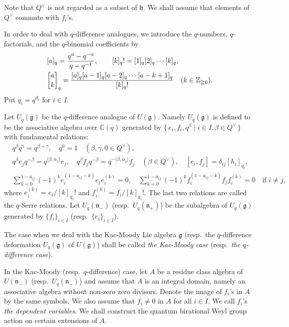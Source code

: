 \documentclass[12pt,twoside]{article}
\newcommand\bra{\langle}
\newcommand\ket{\rangle}
\newcommand\Qv{Q^\vee}
\newcommand\g{{\mathfrak g}}
\newcommand\h{{\mathfrak h}}
\newcommand\n{{\mathfrak n}}
\newcommand\Z{{\mathbb Z}} %
\newcommand\C{{\mathbb C}} %
\theoremstyle{plain} %
\theoremstyle{definition} %
\theoremstyle{definition} %
\numberwithin{theorem}{section}
\numberwithin{equation}{section}
\numberwithin{figure}{section}
\numberwithin{table}{section}
\begin{document}
Note that $\Qv$ is not regarded as a subset of $\h$.
We shall assume that elements of $\Qv$ commute with $f_i$'s.

In order to deal with $q$-difference analogues, 
we introduce the $q$-numbers, $q$-factorials, and 
the $q$-binomial coefficients by
\begin{align*}
 &
 [a]_q = \frac{q^a-q^{-a}}{q-q^{-1}}, \qquad
 [k]_q! = [1]_q[2]_q\cdots[k]_q, \quad
 \\ &
 \qbinom{a}{k}_q =
 \frac{[a]_q[a-1]_q[a-2]_q\cdots[a-k+1]_q}{[k]_q!}
 \quad  (k\in\Z_{\geqq0}).
\end{align*}
Put $q_i = q^{d_i}$ for $i\in I$.

Let $U_q(\g)$ be the $q$-difference analogue of $U(\g)$. 
Namely $U_q(\g)$ is defined to be the associative algebra over $\C(q)$ 
generated by $\{\,e_i,f_i,q^\beta\mid i\in I, \beta\in\Qv \,\}$ 
with fundamental relations:
\begin{align*}
 &
 q^\beta q^\gamma = q^{\beta+\gamma}, \quad q^0=1
 \quad (\beta,\gamma,0\in\Qv),
 \\ &
 q^\beta e_j q^{-\beta} = q^{ \bra\beta,\alpha_j\ket} e_j, \quad
 q^\beta f_j q^{-\beta} = q^{-\bra\beta,\alpha_j\ket} f_j
 \quad (\beta\in\Qv), \quad
 [e_i,f_j] = \delta_{ij}[h_i]_{q_i},
 \\ &
 \sum_{k=0}^{1-a_{ij}} 
 (-1)^k e_i^{(1-a_{ij}-k)}e_je_i^{(k)} = 0,
 \quad
 \sum_{k=0}^{1-a_{ij}} 
 (-1)^k f_i^{(1-a_{ij}-k)}f_jf_i^{(k)} = 0
 \quad\text{if $i\ne j$},
\end{align*}
where $e_i^{(k)}=e_i/[k]_{q_i}!$ and $f_i^{(k)}=f_i/[k]_{q_i}!$.
The last two relations are called the $q$-Serre relations.
Let $U_q(\n_-)$ (resp.\ $U_q(\n_+)$) be 
the subalgebra of $U_q(\g)$ generated by $\{f_i\}_{i\in I}$
(resp.\ $\{e_i\}_{i\in I}$).

The case when we deal with the Kac-Moody Lie algebra $\g$
(resp.\ the $q$-difference deformation $U_q(\g)$ of $U(\g)$)
shall be called {\em the Kac-Moody case} 
(resp.\ {\em the $q$-difference case}).

In the Kac-Moody (resp.\ $q$-difference) case, 
let $A$ be a residue class algebra of $U(\n_-)$ (resp.\ $U_q(\n_-)$)
and assume that $A$ is an integral domain, namely
an associative algebra without non-zero zero divisors.
Denote the image of $f_i$'s in $A$ by the same symbols.
We also assume that $f_i\ne 0$ in $A$ for all $i\in I$.
We call $f_i$'s {\em the dependent variables}.
We shall construct the quantum birational Weyl group action on 
certain extensions of $A$.
\end{document}
